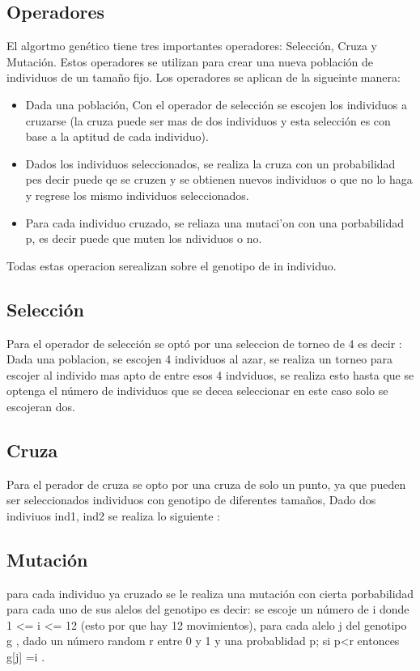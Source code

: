 \documentclass[oneside,10pt]{article}
\begin{document}
\subsection{Operadores}
El algortmo gen\'etico tiene tres importantes operadores: Selecci\'on, Cruza y Mutaci\'on. Estos operadores se utilizan para crear una nueva poblaci\'on de individuos de un tama\~no fijo. Los operadores se aplican de la sigueinte manera:
\begin{itemize}
    \item Dada una poblaci\'on, Con el operador de selecci\'on se escojen los individuos a cruzarse (la cruza puede ser mas de dos individuos y esta selecci\'on es con base a la aptitud de cada individuo).  
    \item Dados los individuos seleccionados, se realiza la cruza con un probabilidad pes decir puede qe se cruzen y se obtienen nuevos individuos o que no lo haga y regrese los mismo individuos seleccionados. 
    \item Para cada individuo cruzado, se reliaza una mutaci'on con  una porbabilidad p, es decir puede que muten los ndividuos o no.  
        
\end{itemize}
Todas estas operacion serealizan sobre el genotipo de in individuo.
\subsection{Selecci\'on}
Para el operador de selecci\'on se opt\'o por una seleccion de torneo de 4 es decir :\\
Dada una poblacion, se escojen 4 individuos al azar, se realiza un torneo para escojer al individo mas apto de entre esos 4 indviduos, se realiza esto hasta que se optenga el n\'umero de individuos que se decea seleccionar en este caso solo se escojeran dos.

\subsection{Cruza}
Para el perador de cruza se opto por una cruza de solo un punto, ya que pueden ser seleccionados individuos con genotipo de diferentes tama\~nos, Dado dos indiviuos ind1, ind2 se realiza lo siguiente :

\subsection{Mutaci\'on}
para cada individuo ya cruzado se le realiza una mutaci\'on con cierta porbabilidad para cada uno de sus alelos del genotipo es decir: se escoje un n\'umero de i donde 1 <= i <= 12 (esto por que hay 12 movimientos), para cada alelo j del genotipo g , dado un n\'umero random r entre 0 y 1 y una probablidad p; si p<r entonces g[j] =i .
\end{document}
